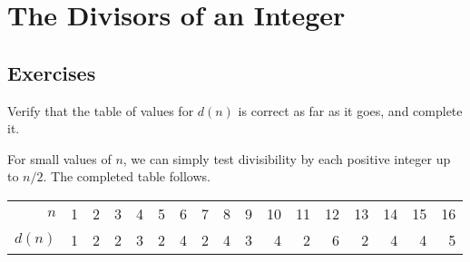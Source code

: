 \chapter{The Divisors of an Integer}

\section{Exercises}

 Verify that the table of values for $d(n)$ is correct as
far as it goes, and complete it.
\begin{solution}
  For small values of $n$, we can simply test divisibility by each
  positive integer up to $n/2$. The completed table follows.
  \begin{center}
    \begin{tabular}{r|rrrrrrrrrrrrrrrr}
      $n$ & 1 & 2 & 3 & 4 & 5 & 6 & 7 & 8 & 9 & 10
      & 11 & 12 & 13 & 14 & 15 & 16 \\
      $d(n)$ & 1 & 2 & 2 & 3 & 2 & 4 & 2 & 4 & 3 & 4
      & 2 & 6 & 2 & 4 & 4 & 5
    \end{tabular}
  \end{center}
\end{solution}
